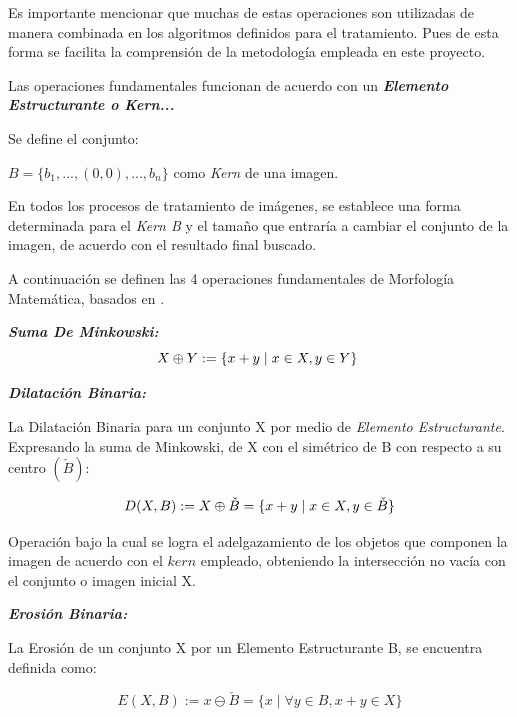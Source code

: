 \documentclass[12pt]{article}
\begin{document}
Es importante mencionar que muchas de estas operaciones son utilizadas de manera combinada en los algoritmos definidos para el tratamiento. Pues de esta forma se facilita la comprensión de la metodología empleada en este proyecto. 

Las operaciones fundamentales funcionan de acuerdo con un \textbf{\textit {Elemento Estructurante o Kern...}}

\justifying
Se define el conjunto:

\centering
$B=\{b_{1},...,(0,0),...,b_{n}\}$
 \newline como \textit{Kern} de una imagen. 

\justifying
En todos los procesos de tratamiento de imágenes, se establece una forma determinada para el \textit{ Kern B} y el tamaño que entraría a cambiar el conjunto de la imagen, de acuerdo con el resultado final buscado.

A continuación se definen las 4 operaciones fundamentales de Morfología Matemática, basados en \cite{villaveces}.

\textbf{\textit{Suma De Minkowski:}}
\begin{equation}
\centering
\textbf{$X \oplus Y := \{ x+y \mid x \in X, y \in Y \}$   }
\end{equation}

\justifying
\textbf{\textit{Dilatación Binaria:}}

La Dilatación Binaria para un conjunto X por medio de \textit{Elemento Estructurante}. Expresando la suma de Minkowski, de X con el simétrico de B con respecto a su centro $(\check{B})$:

\begin{equation}
\centering
\textbf{
$ D(X,B) :=  X \oplus \check{B} = \{x+y \mid x \in X, y \in \check{B} \}$ 
}
\end{equation}
              
\justifying Operación bajo la cual se logra el adelgazamiento de los objetos que componen la imagen de acuerdo con el $kern$ empleado, obteniendo la intersección no vacía con el conjunto o imagen inicial X.   
              
\textbf{\textit{Erosión Binaria:}} 

La Erosión de un conjunto X por un Elemento Estructurante B, se encuentra definida como: 

\begin{equation}
E(X,B) := x \ominus \check{B} = \{ x \mid \forall y \in B, x+y \in X  \}
\end{equation}
\end{document}
